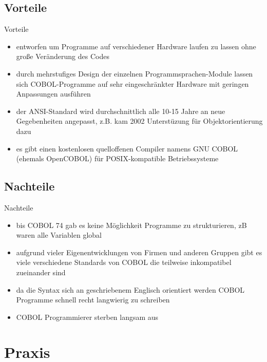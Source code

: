 \documentclass[handout]{beamer}
\begin{document}
\subsection{Vorteile}
\begin{frame}{Vorteile}
	\begin{itemize}[<+->]
		\item
			entworfen um Programme auf verschiedener Hardware laufen zu lassen ohne große Ver\"anderung des Codes
		\item
			durch mehrstufiges Design der einzelnen Programmsprachen-Module lassen sich COBOL-Programme auf sehr eingeschr\"ankter Hardware mit geringen Anpassungen ausf\"uhren
		\item
			der ANSI-Standard wird durchschnittlich alle 10-15 Jahre an neue Gegebenheiten angepasst, z.B. kam 2002 Unterstüzung für Objektorientierung dazu
		\item
			es gibt einen kostenlosen quelloffenen Compiler namens GNU COBOL (ehemals OpenCOBOL) für POSIX-kompatible Betriebssysteme
	\end{itemize}
\end{frame}


\subsection{Nachteile}
\begin{frame}{Nachteile}
	\begin{itemize}[<+->]
		\item
		    bis COBOL 74 gab es keine M\"oglichkeit Programme zu strukturieren, zB waren alle Variablen global
		\item
			aufgrund vieler Eigenentwicklungen von Firmen und anderen Gruppen gibt es viele verschiedene Standards von COBOL die teilweise inkompatibel zueinander sind
		\item
			da die Syntax sich an geschriebenem Englisch orientiert werden COBOL Programme schnell recht langwierig zu schreiben
		\item
			COBOL Programmierer sterben langsam aus
	\end{itemize}
\end{frame}


\section{Praxis}
\end{document}
